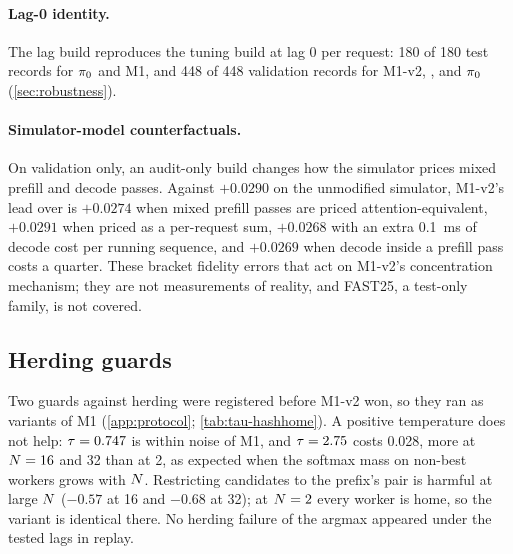 \paragraph{Lag-0 identity.}
The lag build reproduces the tuning build at lag 0 per request: 180 of 180 test records for $\pi_{0}$
and M1, and 448 of 448 validation records for M1-v2, , 
and $\pi_{0}$ (\cref{sec:robustness}).

\paragraph{Simulator-model counterfactuals.}
On validation only, an audit-only \aisim{} build changes how the simulator prices mixed prefill
and decode passes. Against $+0.0290$ on the unmodified simulator, M1-v2's lead over  is
$+0.0274$ when mixed prefill passes are priced attention-equivalent, $+0.0291$ when priced as a
per-request sum, $+0.0268$ with an extra \SI{0.1}{ms} of decode cost per running sequence, and
$+0.0269$ when decode inside a prefill pass costs a quarter. These bracket fidelity errors that act
on M1-v2's concentration mechanism; they are not measurements of reality, and FAST25, a test-only
family, is not covered.

\subsection{Herding guards}

Two guards against herding were registered before M1-v2 won, so they ran as variants of M1
(\cref{app:protocol}; \cref{tab:tau-hashhome}). A positive temperature does not help:
$\tau = 0.747$ is within noise of M1, and $\tau = 2.75$ costs 0.028, more at $N = 16$ and 32
than at 2, as expected when the softmax mass on non-best workers grows with $N$. Restricting
candidates to the prefix's  pair is harmful at large $N$ ($-0.57$ at 16 and
$-0.68$ at 32); at $N = 2$ every worker is home, so the variant is identical there. No herding
failure of the argmax appeared under the tested lags in replay.

